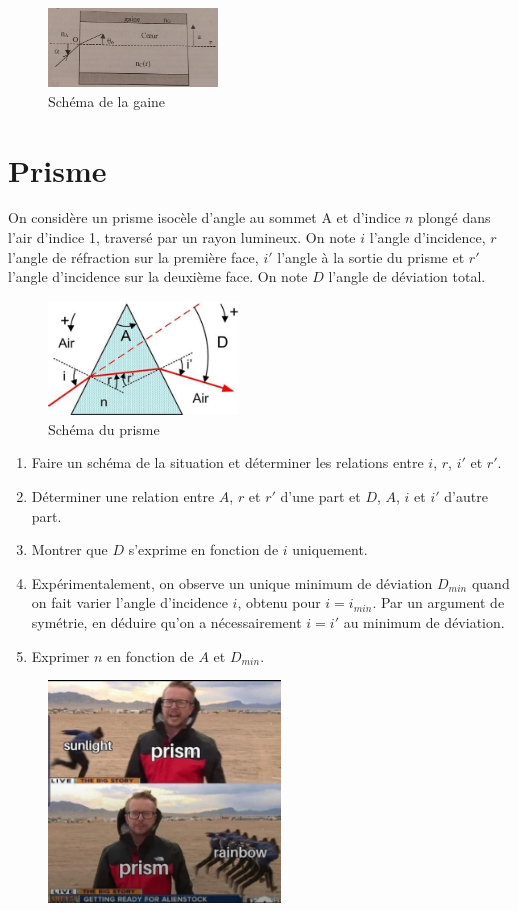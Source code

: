 \documentclass{article}
\begin{document}
\begin{figure}[h!]
  \centering
  \includegraphics[width=0.4\textwidth]{exercice 3.jpg}
    \caption{Schéma de la gaine}
\end{figure}

\newpage
\section{Prisme}

On considère un prisme isocèle d'angle au sommet A et d'indice $n$ plongé dans l'air d'indice 1, traversé par un rayon lumineux. 
On note $i$ l'angle d'incidence, $r$ l'angle de réfraction sur la première face, $i'$ l'angle à la sortie du prisme et $r'$ l'angle d'incidence sur la deuxième face. On note $D$ l'angle de déviation total. 

\begin{figure}[h]
  \centering
  \includegraphics[width=0.45\textwidth]{prisme.jpeg}
  \caption{Schéma du prisme}
\end{figure}
\begin{enumerate}
  \item Faire un schéma de la situation et déterminer les relations entre $i$, $r$, $i'$ et $r'$.
  \item Déterminer une relation entre $A$, $r$ et $r'$ d'une part et $D$, $A$, $i$ et $i'$ d'autre part.
  \item Montrer que $D$ s'exprime en fonction de $i$ uniquement.
  \item Expérimentalement, on observe un unique minimum de déviation $D_{min}$ quand on fait varier l'angle d'incidence $i$, obtenu pour $i=i_{min}$. Par un argument de symétrie, en déduire qu'on a nécessairement $i=i'$ au minimum de déviation. 
  \item Exprimer $n$ en fonction de $A$ et $D_{min}$.\\[1cm]
\end{enumerate}

\begin{figure}[h]
  \centering
  \includegraphics[width=0.55\textwidth]{prisme.jpg}
\end{figure}
\end{document}
